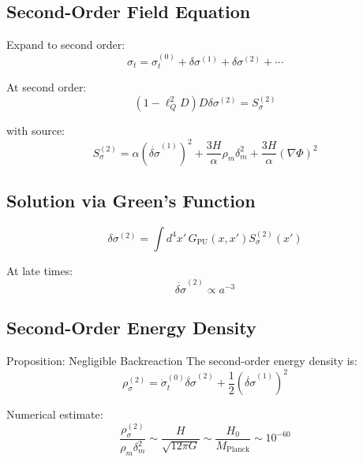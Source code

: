 \documentclass[11pt,a4paper]{article}
\theoremstyle{definition}
\theoremstyle{remark}
\begin{document}
	\subsection{Second-Order Field Equation}
	
	Expand to second order:
	\begin{equation}
		\sigma_t = \sigma_t^{(0)} + \delta\sigma^{(1)} + \delta\sigma^{(2)} + \cdots
	\end{equation}
	
	At second order:
	\begin{equation}
		\left(1 - \ell_Q^2 D\right)D\delta\sigma^{(2)} = S_\sigma^{(2)}
	\end{equation}
	
	with source:
	\begin{equation}
		S_\sigma^{(2)} = \alpha(\dot{\delta\sigma}^{(1)})^2 + \frac{3H}{\alpha}\rho_m\delta_m^2 + \frac{3H}{\alpha}(\nabla\Phi)^2
	\end{equation}
	
	\subsection{Solution via Green's Function}
	
	\begin{equation}
		\delta\sigma^{(2)} = \int d^4x'\, G_{\text{PU}}(x, x') S_\sigma^{(2)}(x')
	\end{equation}
	
	At late times:
	\begin{equation}
		\dot{\delta\sigma}^{(2)} \propto a^{-3}
	\end{equation}
	
	\subsection{Second-Order Energy Density}
	
	Proposition: Negligible Backreaction
		The second-order energy density is:
		\begin{equation}
			\rho_\sigma^{(2)} = \dot{\sigma}_t^{(0)}\dot{\delta\sigma}^{(2)} + \frac{1}{2}(\dot{\delta\sigma}^{(1)})^2
		\end{equation}
		
		Numerical estimate:
		\begin{equation}
			\frac{\rho_\sigma^{(2)}}{\rho_m\delta_m^2} \sim \frac{H}{\sqrt{12\pi G}} \sim \frac{H_0}{M_{\text{Planck}}} \sim 10^{-60}
		\end{equation}
	
\end{document}
